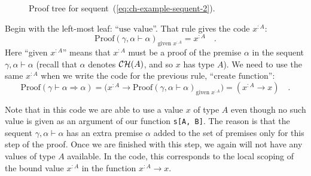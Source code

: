 \begin{figure}
\begin{centering}
{\footnotesize{}}%
\par\end{centering}
\caption{Proof tree for sequent~(\ref{eq:ch-example-sequent-2}).\label{fig:Proof-of-the-sequent-example-2}}
\end{figure}

Begin with the left-most leaf: \textsf{``}$\text{use value}$\textsf{''}. That rule
gives the code $x^{:A}$:
\[
\text{Proof}\left(\gamma,\alpha\vdash\alpha\right)_{\text{given }x^{:A}}=x^{:A}\quad.
\]
Here \textsf{``}given $x^{:A}$\textsf{''} means that $x^{:A}$ must be a proof of
the premise $\alpha$ in the sequent $\gamma,\alpha\vdash\alpha$
(recall that $\alpha$ denotes ${\cal CH}(A)$, and so $x$ has type
$A$). We need to use the same $x^{:A}$ when we write the code for
the previous rule, \textsf{``}$\text{create function}$\textsf{''}:
\[
\text{Proof}\left(\gamma\vdash\alpha\Rightarrow\alpha\right)=\big(x^{:A}\rightarrow\text{Proof}\left(\gamma,\alpha\vdash\alpha\right)_{\text{given }x^{:A}}\big)=(x^{:A}\rightarrow x)\quad.
\]

Note that in this code we are able to use a value $x$ of type $A$
even though no such value is given as an argument of our function
\lstinline!s[A, B]!. The reason is that the sequent $\gamma,\alpha\vdash\alpha$
has an extra premise $\alpha$ added to the set of premises only for
this step of the proof. Once we are finished with this step, we again
will not have any values of type $A$ available. In the code, this
corresponds to the local scoping of the bound value $x^{:A}$ in the
function $x^{:A}\rightarrow x$. 

